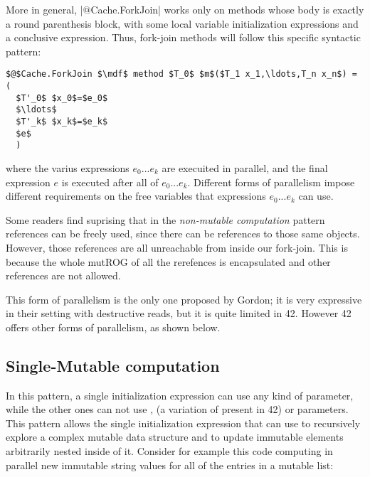 More in general, \Q|$@$Cache.ForkJoin| works only on methods whose body is exactly a round parenthesis block, with some local variable initialization expressions and a conclusive expression.
Thus, fork-join methods will follow this specific syntactic pattern:
\begin{lstlisting}[deletekeywords=label]
$@$Cache.ForkJoin $\mdf$ method $T_0$ $m$($T_1 x_1,\ldots,T_n x_n$) = (
  $T'_0$ $x_0$=$e_0$
  $\ldots$
  $T'_k$ $x_k$=$e_k$
  $e$
  )
\end{lstlisting}
where the varius expressions $e_0...e_k$ are execuited in parallel, and the final expression $e$ is executed after all of $e_0...e_k$.
Different forms of parallelism impose different requirements on the free variables that expressions $e_0...e_k$ can use.

Some readers find suprising that in the \emph{non-mutable computation} pattern \Q@read@ references can be freely used, since there can be \Q@mut@ references to those same objects.
However, those \Q@mut@ references are all unreachable from inside our fork-join. This is because the whole
mutROG of all the \Q@capsule@ rerefences is encapsulated and other \Q@mut@ references are not allowed.

This form of parallelism is the only one proposed by Gordon; it is very expressive in their setting with destructive reads, but it is quite limited in 42. However 42 offers other forms of parallelism, as shown below.



\subsection*{Single-Mutable computation}
In this pattern, a single initialization expression can use any kind of parameter, while the other ones can not 
use \Q@mut@, \Q@lent@ (a variation of \Q@mut@ present in 42) or \Q@read@ parameters.
This pattern allows the single initialization expression that can use \Q@mut@ to recursively explore a complex mutable data structure and to update immutable elements arbitrarily nested inside of it.
Consider for example this code computing in parallel 
new immutable string values for all of
the entries in a mutable list:

